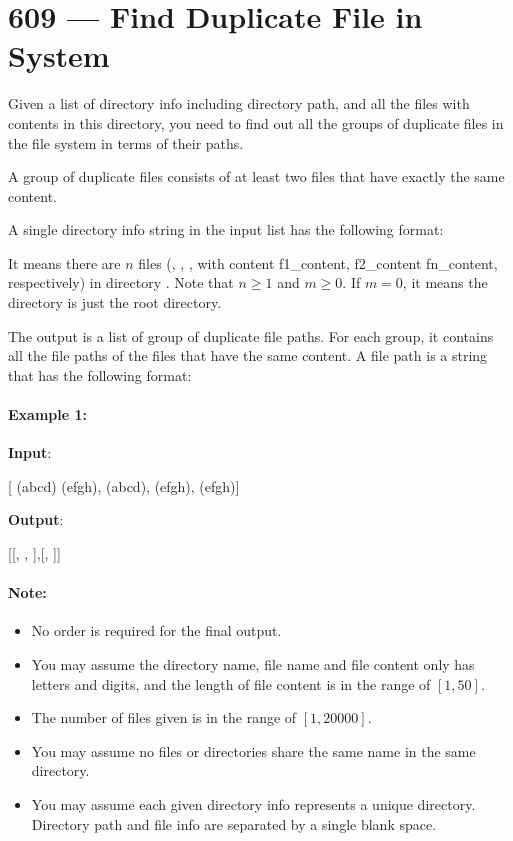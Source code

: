 \section{609 --- Find Duplicate File in System}
Given a list of directory info including directory path, and all the files with contents in this directory, you need to find out all the groups of duplicate files in the file system in terms of their paths.

A group of duplicate files consists of at least two files that have exactly the same content.

A single directory info string in the input list has the following format:


It means there are $n$ files (, , \textellipsis,  with content f1\_content, f2\_content \textellipsis fn\_content, respectively) in directory . Note that $n \geq 1$ and $m \geq 0$. If $m = 0$, it means the directory is just the root directory.

The output is a list of group of duplicate file paths. For each group, it contains all the file paths of the files that have the same content. A file path is a string that has the following format:


\paragraph{Example 1:}

\textbf{Input}:

[ (abcd) (efgh),  (abcd),  (efgh),  (efgh)]

\textbf{Output}:
  
[[, , ],[, ]]

 

\paragraph{Note:}

\begin{itemize}
\item No order is required for the final output.
\item You may assume the directory name, file name and file content only has letters and digits, and the length of file content is in the range of $[1,50]$.
\item The number of files given is in the range of $[1,20000]$.
\item You may assume no files or directories share the same name in the same directory.
\item You may assume each given directory info represents a unique directory. Directory path and file info are separated by a single blank space.
\end{itemize}

